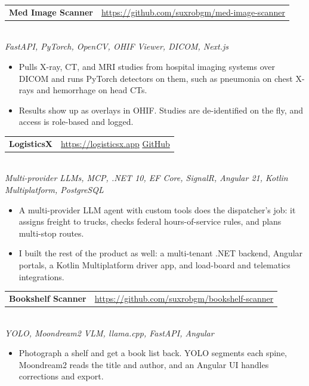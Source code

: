 \documentclass[letterpaper,11pt]{article}
\makeatletter
\newcommand{\projectEntry}[3]{%
    \vspace{2pt}\noindent
    \begin{tabular*}{\textwidth}{@{}l@{\extracolsep{\fill}}r@{}}
        {\textbf{\color{accent}#1}} & {\small\href{#3}{\color{linkcolor}#3}} \\
    \end{tabular*}\vspace{-3pt}\\
    {\small\color{lighttext}\textit{#2}}\vspace{-2pt}
}
\newcommand{\projectEntryDual}[4]{%
    \vspace{2pt}\noindent
    \begin{tabular*}{\textwidth}{@{}l@{\extracolsep{\fill}}r@{}}
        {\textbf{\color{accent}#1}} & {\small\href{#3}{\color{linkcolor}#3} \enspace\color{lighttext}\textbar\enspace \href{#4}{\color{linkcolor}GitHub}} \\
    \end{tabular*}\vspace{-3pt}\\
    {\small\color{lighttext}\textit{#2}}\vspace{-2pt}
}
\makeatother
\begin{document}
\projectEntry{Med Image Scanner}{FastAPI, PyTorch, OpenCV, OHIF Viewer, DICOM, Next.js}
{https://github.com/suxrobgm/med-image-scanner}
\begin{itemize}
    \item Pulls X-ray, CT, and MRI studies from hospital imaging systems over DICOM and runs PyTorch detectors on them, such as pneumonia on chest X-rays and hemorrhage on head CTs.
    \item Results show up as overlays in OHIF. Studies are de-identified on the fly, and access is role-based and logged.
\end{itemize}

\projectEntryDual{LogisticsX}{Multi-provider LLMs, MCP, .NET 10, EF Core, SignalR, Angular 21, Kotlin Multiplatform, PostgreSQL}
{https://logisticsx.app}
{https://github.com/suxrobgm/logistics-app}
\begin{itemize}
    \item A multi-provider LLM agent with custom tools does the dispatcher's job: it assigns freight to trucks, checks federal hours-of-service rules, and plans multi-stop routes.
    \item I built the rest of the product as well: a multi-tenant .NET backend, Angular portals, a Kotlin Multiplatform driver app, and load-board and telematics integrations.
\end{itemize}

\projectEntry{Bookshelf Scanner}{YOLO, Moondream2 VLM, llama.cpp, FastAPI, Angular}
{https://github.com/suxrobgm/bookshelf-scanner}
\begin{itemize}
    \item Photograph a shelf and get a book list back. YOLO segments each spine, Moondream2 reads the title and author, and an Angular UI handles corrections and export.
\end{itemize}
\end{document}
